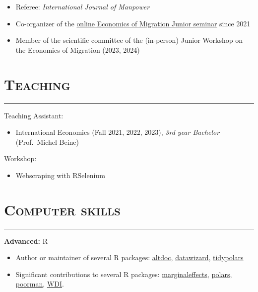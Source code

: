 \documentclass{article}
\newcommand{\sectionline}{%
  \vspace{-0.6cm}%
  \par\noindent\rule{\textwidth}{0.4pt}%
  \vspace{0.3cm}%
}
\let\xsection=\section
\renewcommand{\section}[1]{%
  \vspace{0.4cm}%
  \xsection*{\scshape{#1}}%
  \sectionline%
}
\def\tightlist{}
\begin{document}
\begin{itemize}
\item
  Referee: \emph{International Journal of Manpower}
\item
  Co-organizer of the
  \href{https://sites.google.com/view/the-economics-of-migration}{online
  Economics of Migration Junior seminar} since 2021
\item
  Member of the scientific committee of the (in-person) Junior Workshop
  on the Economics of Migration (2023, 2024)
\end{itemize}

\hypertarget{teaching}{%
\section{Teaching}\label{teaching}}

Teaching Assistant:

\begin{itemize}
\tightlist
\item
  International Economics (Fall 2021, 2022, 2023), \emph{3rd year
  Bachelor} (Prof.~Michel Beine)
\end{itemize}

Workshop:

\begin{itemize}
\tightlist
\item
  Webscraping with RSelenium
\end{itemize}

\hypertarget{computer-skills}{%
\section{Computer skills}\label{computer-skills}}

\textbf{Advanced:} R

\begin{itemize}
\item
  Author or maintainer of several R packages:
  \href{https://github.com/etiennebacher/altdoc}{altdoc},
  \href{https://easystats.github.io/datawizard/}{datawizard},
  \href{https://tidypolars.etiennebacher.com/}{tidypolars}
\item
  Significant contributions to several R packages:
  \href{https://vincentarelbundock.github.io/marginaleffects/}{marginaleffects},
  \href{https://rpolars.github.io/}{polars},
  \href{https://nathaneastwood.github.io/poorman/}{poorman},
  \href{https://vincentarelbundock.github.io/WDI/}{WDI}.
\end{itemize}
\end{document}
